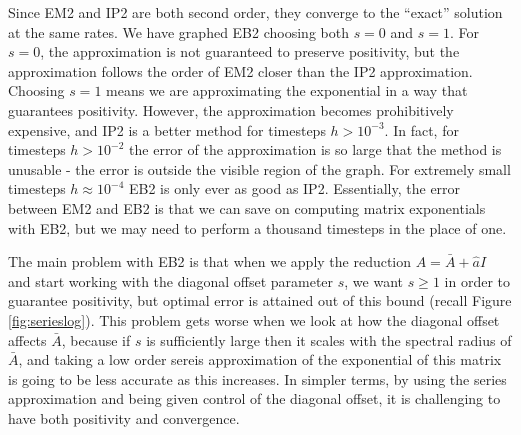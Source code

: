 Since EM2 and IP2 are both second order, they converge to the ``exact'' solution at the same rates.
We have graphed EB2 choosing both $s=0$ and $s=1$. For $s=0$, the approximation is not guaranteed to preserve positivity,
but the approximation follows the order of EM2 closer than the IP2 approximation.
Choosing $s=1$ means we are approximating the exponential in a way that guarantees positivity.
However, the approximation becomes prohibitively expensive, and IP2 is a better method for timesteps $h > 10^{-3}$.
In fact, for timesteps $h > 10^{-2}$ the error of the approximation is so large that the method is unusable - the error is outside the visible region of the graph. 
For extremely small timesteps $h \approx 10^{-4}$ EB2 is only ever as good as IP2.
Essentially, the error between EM2 and EB2 is that we can save on computing matrix exponentials with EB2,
but we may need to perform a thousand timesteps in the place of one.

The main problem with EB2 is that when we apply the reduction $A = \bar{A} + \hat{a}I$ and start working with the diagonal offset parameter $s$,
we want $s \ge 1$ in order to guarantee positivity, but optimal error is attained out of this bound (recall Figure \ref{fig:serieslog}).
This problem gets worse when we look at how the diagonal offset affects $\bar{A}$, because if $s$ is sufficiently large then it scales with the spectral radius of $\bar{A}$,
and taking a low order sereis approximation of the exponential of this matrix is going to be less accurate as this increases.
In simpler terms, by using the series approximation and being given control of the diagonal offset, it is challenging to have both positivity and convergence.



